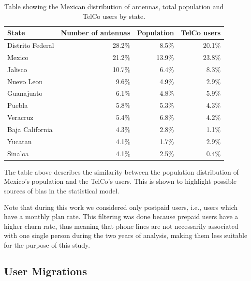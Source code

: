 \begin{table}[ht]
	\caption{Table showing the Mexican distribution of antennas, total population and TelCo users by state.}\label{tab:distribution_by_state}
	\centering
	\begin{tabular}{l r r r}
		\toprule
		State				& Number of antennas & Population 	& TelCo users \\
		\midrule
		Distrito Federal      & 28.2\% 	& 8.5\%		& 20.1\%   \\
		Mexico                     & 21.2\%		&   13.9\% 	& 23.8\%   \\
		Jalisco                   & 10.7\% 	& 6.4\%		& 8.3\%    \\
		Nuevo Leon               & 9.6\%	& 4.9\%		& 2.9\% \\
		Guanajuato               & 6.1\%	& 4.8\%		& 5.9\% \\
		Puebla                     & 5.8\%	& 5.3\%		& 4.3\% \\
		Veracruz                  & 5.4\% 	& 6.8\%		& 4.2\% \\
		Baja California       & 4.3\%	& 2.8\%		& 1.1\% \\
		Yucatan                   & 4.1\%	& 1.7\%		& 2.9\% \\
		Sinaloa                   & 4.1\%	& 2.5\%		& 0.4\% \\
		\bottomrule
	\end{tabular}
\end{table}

The table above describes the similarity between the population distribution of Mexico's population and the TelCo's users.
This is shown to highlight possible sources of bias in the statistical model.

Note that during this work we considered only postpaid users, i.e., users which have a monthly plan rate.
This filtering was done because prepaid users have a higher churn rate, thus meaning that phone lines are not necessarily associated with one single person during the two years of analysis, making them less suitable for the purpose of this study.




\subsection{User Migrations}\label{subsection:user_migrations} %

